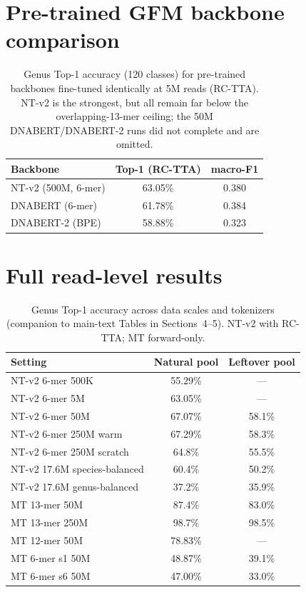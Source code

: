 \documentclass[11pt]{article}
\begin{document}
\section{Pre-trained GFM backbone comparison}
\begin{table}[h]
\centering
\caption{Genus Top-1 accuracy (120 classes) for pre-trained backbones
fine-tuned identically at 5M reads (RC-TTA). NT-v2 is the strongest, but all
remain far below the overlapping-13-mer ceiling; the 50M DNABERT/DNABERT-2 runs
did not complete and are omitted.}
\small
\begin{tabularx}{\linewidth}{@{}Xcc@{}}
\toprule
Backbone & Top-1 (RC-TTA) & macro-F1 \\
\midrule
NT-v2 (500M, 6-mer) & 63.05\% & 0.380 \\
DNABERT (6-mer) & 61.78\% & 0.384 \\
DNABERT-2 (BPE) & 58.88\% & 0.323 \\
\bottomrule
\end{tabularx}
\end{table}

\section{Full read-level results}
\begin{table}[h]
\centering
\caption{Genus Top-1 accuracy across data scales and tokenizers
(companion to main-text Tables in Sections~4--5). NT-v2 with RC-TTA; MT
forward-only.}
\small
\begin{tabularx}{\linewidth}{@{}Xcc@{}}
\toprule
Setting & Natural pool & Leftover pool \\
\midrule
NT-v2 6-mer 500K            & 55.29\% & --- \\
NT-v2 6-mer 5M             & 63.05\% & --- \\
NT-v2 6-mer 50M            & 67.07\% & 58.1\% \\
NT-v2 6-mer 250M warm       & 67.29\% & 58.3\% \\
NT-v2 6-mer 250M scratch    & 64.8\%  & 55.5\% \\
NT-v2 17.6M species-balanced & 60.4\% & 50.2\% \\
NT-v2 17.6M genus-balanced   & 37.2\% & 35.9\% \\
MT 13-mer 50M              & 87.4\%  & 83.0\% \\
MT 13-mer 250M             & 98.7\%  & 98.5\% \\
MT 12-mer 50M              & 78.83\% & --- \\
MT 6-mer s1 50M            & 48.87\% & 39.1\% \\
MT 6-mer s6 50M            & 47.00\% & 33.0\% \\
\bottomrule
\end{tabularx}
\end{table}
\end{document}
